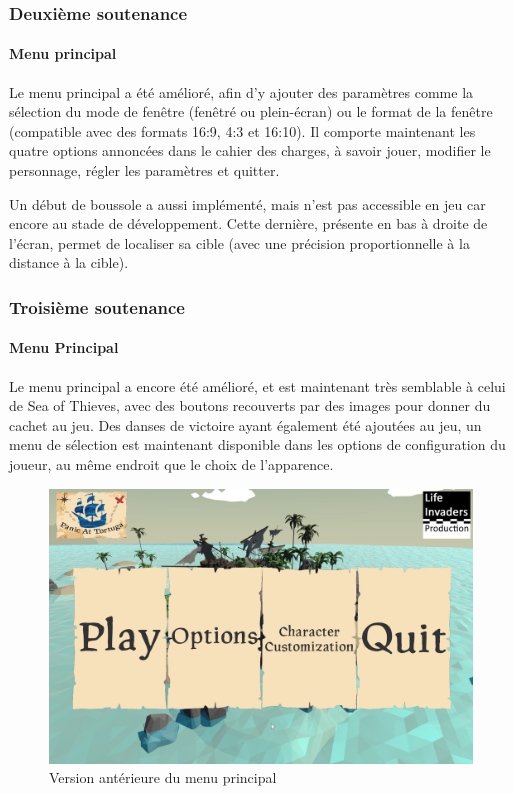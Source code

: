     \subsubsection{Deuxième soutenance}
    
        \paragraph{Menu principal}
        
            Le menu principal a été amélioré, afin d'y ajouter des paramètres comme la sélection du mode de fenêtre (fenêtré 
            ou plein-écran) ou le format de la fenêtre (compatible avec des formats 16:9, 4:3 et 16:10).
            Il comporte maintenant les quatre options annoncées dans le cahier des charges, à savoir jouer, modifier le personnage, 
            régler les paramètres et quitter.

            Un début de boussole a aussi implémenté, mais n'est pas accessible en jeu car encore au stade de développement. Cette dernière, 
            présente en bas à droite de l'écran, permet de localiser sa cible (avec une précision proportionnelle à la distance à la cible).

    \subsubsection{Troisième soutenance}
    
        \paragraph{Menu Principal}
        
            Le menu principal a encore été amélioré, et est maintenant très semblable à celui de Sea of Thieves, avec des boutons recouverts 
            par des images pour donner du cachet au jeu. Des danses de victoire ayant également été ajoutées au jeu, un menu de sélection est maintenant 
            disponible dans les options de configuration du joueur, au même endroit que le choix de l'apparence.
        
            \begin{figure}[hbt!]
                \centering
                \includegraphics[scale=0.4]{img/mainmenu.png}
                \caption{Version antérieure du menu principal}
            \end{figure}

